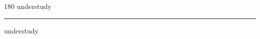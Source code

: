 
\begin{frame}
\begin{center}
\begin{turn}{180}
{\fontsize{2.5cm}{1em}\selectfont understudy}
\end{turn}
\vspace{1em}\par  
\hrule
\vspace{1em}\par  
{\fontsize{2.5cm}{1em}\selectfont understudy}
\end{center}
\end{frame}
